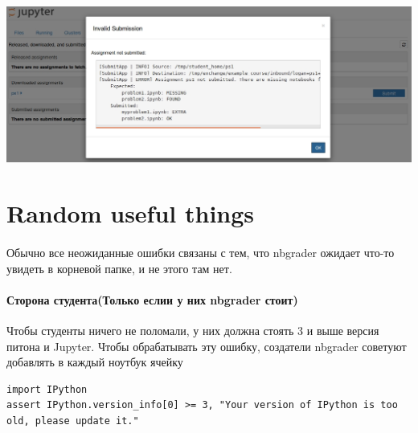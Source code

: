 \documentclass[a4paper,12pt]{article}
\begin{document}
\includegraphics[width=\textwidth]{assignment_list_submit_error}

\section{Random useful things}

\paragraph{}
Обычно все неожиданные ошибки связаны с тем, что nbgrader ожидает что-то увидеть в корневой папке, и не этого там нет.
\paragraph{Сторона студента(Только еслии у них nbgrader стоит)}
Чтобы студенты ничего не поломали, у них должна стоять 3 и выше версия питона и Jupyter.
Чтобы обрабатывать эту ошибку, создатели nbgrader советуют добавлять в каждый ноутбук ячейку
\begin{verbatim} 
import IPython
assert IPython.version_info[0] >= 3, "Your version of IPython is too old, please update it."
\end{verbatim} 
\end{document}
